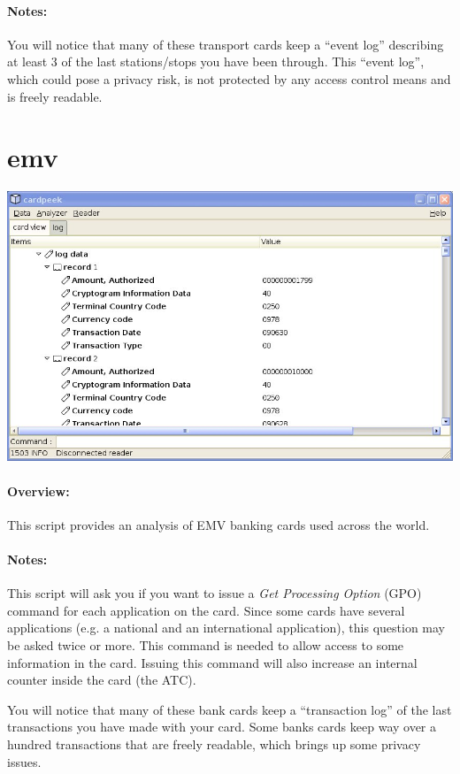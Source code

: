 \documentclass[11pt]{report}
\begin{document}
\paragraph{Notes:}
You will notice that many of these transport cards keep a ``event log'' describing at least 3 of the last stations/stops you have been through.
This ``event log'', which could pose a privacy risk, is not protected by any access control means and is freely readable.

\section{emv}

\begin{center}
\includegraphics[width=.75\textwidth]{graphics/sample-emv.jpg}
\end{center}

\paragraph{Overview:}
This script provides an analysis of EMV banking cards used across the world.

\paragraph{Notes:}
This script will ask you if you want to issue a \emph{Get Processing Option} (GPO) command for each application on the card.
Since some cards have several applications (e.g. a national and an international application), this question may be asked twice or more.
This command is needed to allow access to some information in the card.
Issuing this command will also increase an internal counter inside the card (the ATC). 

You will notice that many of these bank cards keep a ``transaction log'' of the last transactions you have made with your card.
Some banks cards keep way over a hundred transactions that are freely readable, which brings up some privacy issues.
\end{document}
